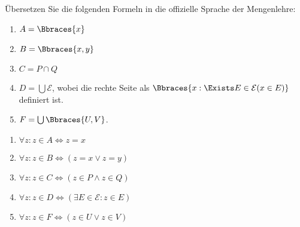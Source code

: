 
\begin{exercise}[14]

Übersetzen Sie die folgenden Formeln in die offizielle Sprache der Mengenlehre:

\begin{enumerate}[label = \alph*.]
    \item $A = \Bbraces{x}$
    \item $B = \Bbraces{x, y}$
    \item $C = P \cap Q$
    \item $D = \bigcup \mathcal{E}$, wobei die rechte Seite als $\Bbraces{x: \Exists E \in \mathcal{E}(x \in E)}$ definiert ist.
    \item $F = \bigcup \Bbraces{U, V}$.
\end{enumerate}

\end{exercise}


\begin{solution}
\phantom{}
\begin{enumerate}[label = \alph*.]
    \item $\forall z: z \in A \iff z = x$
    \item $\forall z: z \in B \iff (z = x \lor z = y)$
    \item $\forall z: z \in C \iff (z \in P \land z \in Q)$
    \item $\forall z: z \in D \iff (\exists E \in \mathcal{E}: z \in E)$
    \item $\forall z: z \in F \iff (z \in U \lor z \in V)$
\end{enumerate}
\end{solution}

